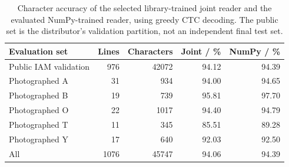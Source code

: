 \begin{table}[!htbp]\centering\small
\begin{tabular}{lrrrr}\toprule
\textbf{Evaluation set} & \textbf{Lines} & \textbf{Characters} & \textbf{Joint / \%} & \textbf{NumPy / \%}\\\midrule
Public IAM validation & 976 & 42072 & 94.12 & 94.39\\
Photographed A & 31 & 934 & 94.00 & 94.65\\
Photographed B & 19 & 739 & 95.81 & 97.70\\
Photographed O & 22 & 1017 & 94.40 & 94.79\\
Photographed T & 11 & 345 & 85.51 & 89.28\\
Photographed Y & 17 & 640 & 92.03 & 92.50\\
All & 1076 & 45747 & 94.06 & 94.39\\
\bottomrule\end{tabular}
\caption{Character accuracy of the selected library-trained joint reader and the evaluated NumPy-trained reader, using greedy CTC decoding. The public set is the distributor's validation partition, not an independent final test set.}\label{tab:res-r2-reader}
\end{table}
